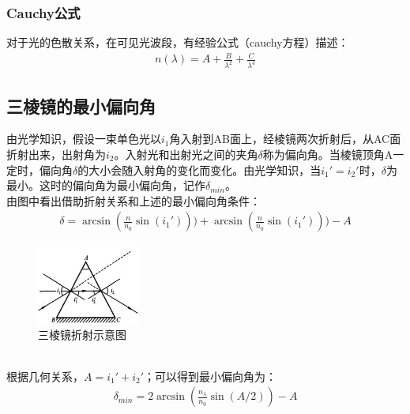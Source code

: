 \documentclass[UTF8]{ctexart}
\begin{document}
\subsubsection{Cauchy公式}
对于光的色散关系，在可见光波段，有经验公式（cauchy方程）描述：\\
\begin{align}
    n(\lambda)=A+\frac{B}{\lambda^2}+\frac{C}{\lambda^4}
\end{align}

\subsection{三棱镜的最小偏向角}
由光学知识，假设一束单色光以$i_1$角入射到AB面上，经棱镜两次折射后，从AC面折射出来，出射角为$i_2$。入射光和出射光之间的夹角$\delta$称为偏向角。当棱镜顶角A一定时，偏向角$\delta$的大小会随入射角的变化而变化。由光学知识，当$i_1'=i_2'$时，$\delta$为最小。这时的偏向角为最小偏向角，记作$\delta_{min}$。\\
由图中看出借助折射关系和上述的最小偏向角条件：
\begin{align}
    \delta=\arcsin(\frac{n}{n_0}\sin(i_1')))+\arcsin(\frac{n}{n_0}\sin(i_1')))-A
\end{align}
\begin{figure}[h]
    \centering
    \includegraphics[width=0.3\textwidth]{tri.png}
    \caption{三棱镜折射示意图}
    \label{fig:tri}
\end{figure}
\\
根据几何关系，$A=i_1'+i_2'$；可以得到最小偏向角为：
\begin{align}
    \delta_{min}=2\arcsin(\frac{n_{\lambda}}{n_0}\sin(A/2))-A
\end{align}
\end{document}
